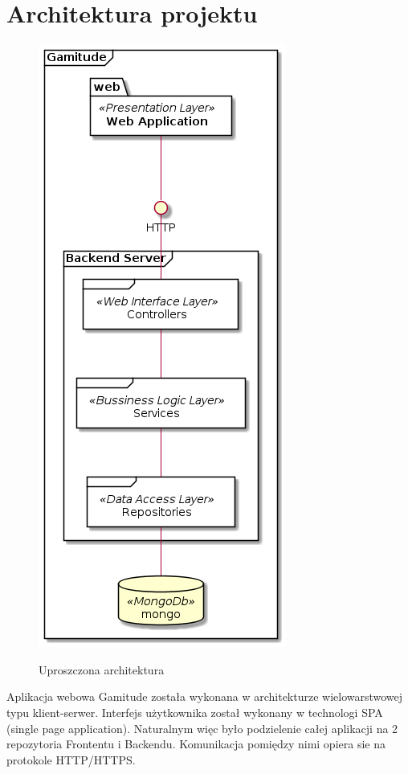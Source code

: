 \documentclass[a4paper,11pt]{report}
\begin{document}
\section {Architektura projektu}
\begin{figure}[]
	\centering
	\includegraphics[scale=0.5]{gamitude_overview}\\
	\caption{Uproszczona architektura}
	\label{fig:overwiewarch}
\end{figure}
Aplikacja webowa Gamitude została wykonana w architekturze wielowarstwowej typu klient-serwer.
Interfejs użytkownika został wykonany w technologi SPA (single page application).
Naturalnym więc było podzielenie całej aplikacji na 2 repozytoria Frontentu i Backendu.
Komunikacja pomiędzy nimi opiera sie na protokole HTTP/HTTPS.
\end{document}
